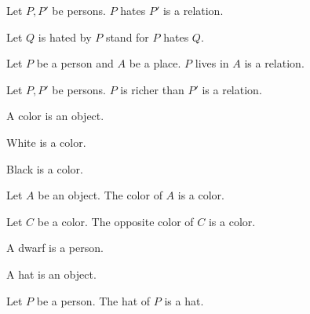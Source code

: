 \begin{forthel}
  \begin{signature*}
    Let $P, P'$ be persons.
    $P$ hates $P'$ is a relation.
  \end{signature*}

  Let $Q$ is hated by $P$ stand for $P$ hates $Q$.

  \begin{signature*}
    Let $P$ be a person and $A$ be a place.
    $P$ lives in $A$ is a relation.
  \end{signature*}

  \begin{signature*}
    Let $P, P'$ be persons.
    $P$ is richer than $P'$ is a relation.
  \end{signature*}
\end{forthel}



\begin{forthel}
  \begin{signature*}
    A color is an object.
  \end{signature*}

  \begin{signature*}
    White is a color.
  \end{signature*}

  \begin{signature*}
    Black is a color.
  \end{signature*}

  \begin{signature*}
    Let $A$ be an object.
    The color of $A$ is a color.
  \end{signature*}

  \begin{signature*}
    Let $C$ be a color.
    The opposite color of $C$ is a color.
  \end{signature*}
\end{forthel}



\begin{forthel}
  \begin{signature*}
    A dwarf is a person.
  \end{signature*}
\end{forthel}



\begin{forthel}
  \begin{signature*}
    A hat is an object.
  \end{signature*}

  \begin{signature*}
    Let $P$ be a person.
    The hat of $P$ is a hat.
  \end{signature*}
\end{forthel}


